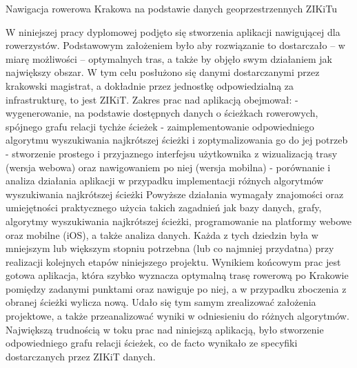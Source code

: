 Nawigacja rowerowa Krakowa na podstawie danych geoprzestrzennych ZIKiTu

W niniejszej pracy dyplomowej podjęto się stworzenia aplikacji nawigującej dla rowerzystów. Podstawowym założeniem było aby rozwiązanie to dostarczało – w miarę możliwości – optymalnych tras, a także by objęło swym działaniem jak największy obszar.  W tym celu posłużono się danymi dostarczanymi przez krakowski magistrat, a dokładnie przez jednostkę odpowiedzialną za infrastrukturę, to jest ZIKiT. 
Zakres prac nad aplikacją obejmował:
- wygenerowanie, na podstawie dostępnych danych o ścieżkach rowerowych, spójnego grafu relacji tychże ścieżek
- zaimplementowanie odpowiedniego algorytmu wyszukiwania najkrótszej ścieżki i zoptymalizowania go do jej potrzeb
- stworzenie prostego i przyjaznego interfejsu użytkownika z wizualizacją trasy (wersja webowa) oraz nawigowaniem po niej (wersja mobilna)
- porównanie i analiza działania aplikacji w przypadku implementacji różnych algorytmów wyszukiwania najkrótszej ścieżki
Powyższe działania wymagały znajomości oraz umiejętności praktycznego użycia takich zagadnień jak bazy danych, grafy, algorytmy wyszukiwania najkrótszej ścieżki, programowanie na platformy webowe oraz mobilne (iOS), a także analiza danych. Każda z tych dziedzin była w mniejszym lub większym stopniu potrzebna (lub co najmniej przydatna) przy realizacji kolejnych etapów niniejszego projektu.
Wynikiem końcowym prac jest gotowa aplikacja, która szybko wyznacza optymalną trasę rowerową po Krakowie pomiędzy zadanymi punktami oraz nawiguje po niej, a w przypadku zboczenia z obranej ścieżki wylicza nową. Udało się tym samym zrealizować założenia projektowe, a także przeanalizować wyniki w odniesieniu do różnych algorytmów.
Największą trudnością w toku prac nad niniejszą aplikacją, było stworzenie odpowiedniego grafu relacji ścieżek, co de facto wynikało ze specyfiki dostarczanych przez ZIKiT danych.